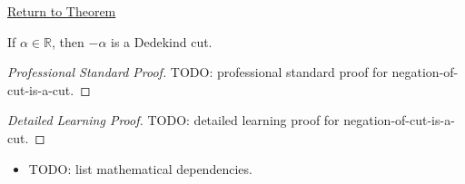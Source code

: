 \newpage
{}
\label{prf:negation-of-cut-is-a-cut}

\begin{remark*}[Return]
\hyperref[lem:negation-of-cut-is-a-cut]{Return to Theorem}
\end{remark*}

\begin{lemma*}
If $\alpha\in\mathbb{R}$, then $-\alpha$ is a Dedekind cut.
\end{lemma*}

\begin{proof}[Professional Standard Proof]
\LRAProofBodyStart
TODO: professional standard proof for negation-of-cut-is-a-cut.
\end{proof}

\begin{proof}[Detailed Learning Proof]
\LRAProofBodyStart
TODO: detailed learning proof for negation-of-cut-is-a-cut.
\end{proof}

\begin{remark*}
\end{remark*}

\begin{dependencies}
\begin{itemize}
  \item TODO: list mathematical dependencies.
\end{itemize}
\end{dependencies}

\clearpage
